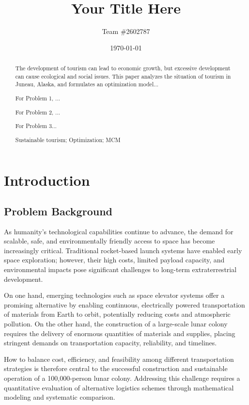 \documentclass[demo]{mcmthesis}
\title{Your Title Here}
\author{Team \#2602787}
\date{\today}
\begin{document}
\begin{abstract}
    The development of tourism can lead to economic growth, but excessive development can cause ecological and social issues. This paper analyzes the situation of tourism in Juneau, Alaska, and formulates an optimization model...

    For Problem 1, ...

    For Problem 2, ...

    For Problem 3...

    \begin{keywords}
        Sustainable tourism; Optimization; MCM
    \end{keywords}
\end{abstract}

\maketitle

\tableofcontents
\newpage

\section{Introduction}
\subsection{Problem Background}
\setlength{\parindent}{2em}
As humanity's technological capabilities continue to advance, the demand for scalable, safe, and environmentally friendly access to space has become increasingly critical. Traditional rocket-based launch systems have enabled early space exploration; however, their high costs, limited payload capacity, and environmental impacts pose significant challenges to long-term extraterrestrial development.

On one hand, emerging technologies such as space elevator systems offer a promising alternative by enabling continuous, electrically powered transportation of materials from Earth to orbit, potentially reducing costs and atmospheric pollution. On the other hand, the construction of a large-scale lunar colony requires the delivery of enormous quantities of materials and supplies, placing stringent demands on transportation capacity, reliability, and timelines.

How to balance cost, efficiency, and feasibility among different transportation strategies is therefore central to the successful construction and sustainable operation of a 100,000-person lunar colony. Addressing this challenge requires a quantitative evaluation of alternative logistics schemes through mathematical modeling and systematic comparison.
\end{document}
